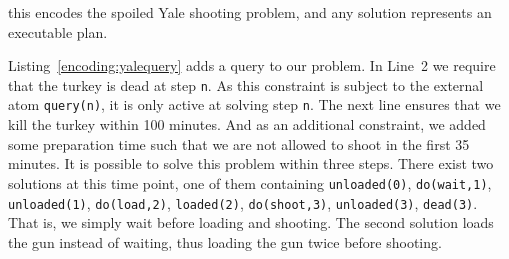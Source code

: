 this encodes the spoiled Yale shooting problem,
and any solution represents an executable plan.

Listing~\ref{encoding:yalequery} adds a query to our problem.
In Line~2 we require that the turkey is dead at step \texttt{n}.
As this constraint is subject to the external atom \texttt{query(n)},
it is only active at solving step \texttt{n}.
The next line ensures that we kill the turkey within 100 minutes.
And as an additional constraint,
we added some preparation time such that we are not allowed 
to shoot in the first 35 minutes.
%
It is possible to solve this problem within three steps.
There exist two solutions at this time point,
one of them containing
\texttt{unloaded(0)}, \texttt{do(wait,1)}, \texttt{unloaded(1)},
\texttt{do(load,2)}, \texttt{loaded(2)},
\texttt{do(shoot,3)}, \texttt{unloaded(3)}, \texttt{dead(3)}.
That is, we simply wait before loading and shooting.
The second solution loads the gun instead of waiting,
thus loading the gun twice before shooting.

